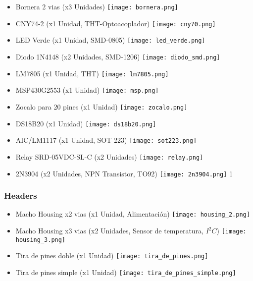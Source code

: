 \documentclass[a4paper]{article}
\numberwithin{equation}{section}
\numberwithin{figure}{section}
\begin{document}
\begin{itemize}
\begin{itemize}
\item Bornera 2 vias (x3 Unidades)
\texttt{[image: bornera.png]}	
\item CNY74-2 (x1 Unidad, THT-Optoacoplador)
\texttt{[image: cny70.png]}	
\item LED Verde (x1 Unidad, SMD-0805)
\texttt{[image: led\_verde.png]}	
\item Diodo 1N4148 (x2 Unidades, SMD-1206)
\texttt{[image: diodo\_smd.png]}	
\item LM7805 (x1 Unidad, THT)
\texttt{[image: lm7805.png]}	
\item MSP430G2553 (x1 Unidad)
\texttt{[image: msp.png]}	
\item Zocalo para 20 pines (x1 Unidad)
\texttt{[image: zocalo.png]}	
\item DS18B20 (x1 Unidad)
\texttt{[image: ds18b20.png]}	
\item AIC/LM1117 (x1 Unidad, SOT-223)
\texttt{[image: sot223.png]}	
\item Relay SRD-05VDC-SL-C (x2 Unidades)
\texttt{[image: relay.png]}	
\item 2N3904 (x2 Unidades, NPN Transistor, TO92)
\texttt{[image: 2n3904.png]}	1
\end{itemize}

\subsubsection {Headers}
\begin{itemize}
\item Macho Housing x2 vias (x1 Unidad, Alimentación)
\texttt{[image: housing\_2.png]}	
\item Macho Housing x3 vias (x2 Unidades, Sensor de temperatura, $I^{2}C$)
\texttt{[image: housing\_3.png]}	
\item Tira de pines doble (x1 Unidad)
\texttt{[image: tira\_de\_pines.png]}	
\item Tira de pines simple (x1 Unidad)
\texttt{[image: tira\_de\_pines\_simple.png]}	

\end{itemize}


\end{itemize}
\end{document}
